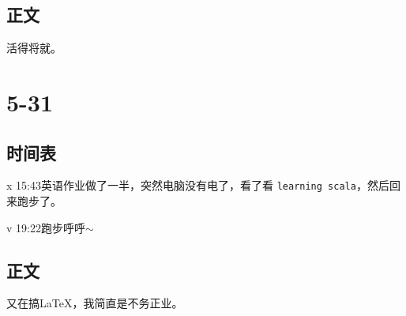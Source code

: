 \documentclass{peterlitsdoc}
\begin{document}
\subsection{正文}

活得将就。


\section{5-31}

\subsection{时间表}

\begin{pltplan}
\item[x]{15:43}{英语作业}{做了一半，突然电脑没有电了，看了看
    \verb|learning scala|，然后回来跑步了。}
\item[v]{19:22}{跑步}{呼呼$\sim$}
\end{pltplan}

\subsection{正文}

又在搞\LaTeX{}，我简直是不务正业。
\end{document}
